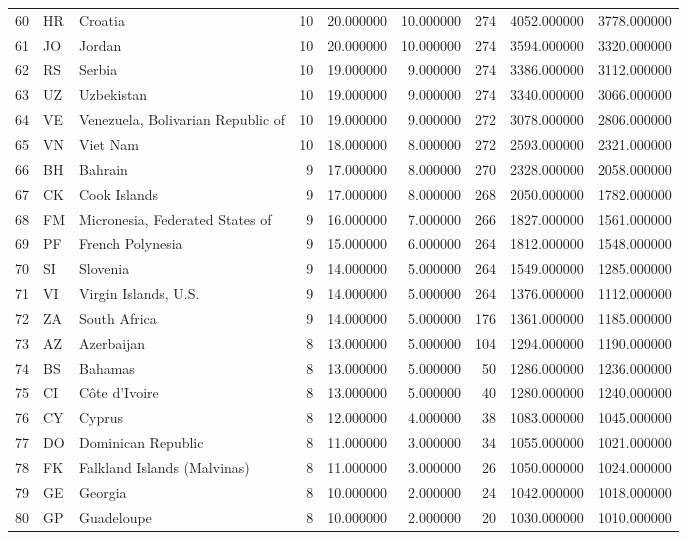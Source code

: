 \begin{tabular}{lllrrrrrr}
60 & HR & Croatia & 10 & 20.000000 & 10.000000 & 274 & 4052.000000 & 3778.000000 \\
61 & JO & Jordan & 10 & 20.000000 & 10.000000 & 274 & 3594.000000 & 3320.000000 \\
62 & RS & Serbia & 10 & 19.000000 & 9.000000 & 274 & 3386.000000 & 3112.000000 \\
63 & UZ & Uzbekistan & 10 & 19.000000 & 9.000000 & 274 & 3340.000000 & 3066.000000 \\
64 & VE & Venezuela, Bolivarian Republic of & 10 & 19.000000 & 9.000000 & 272 & 3078.000000 & 2806.000000 \\
65 & VN & Viet Nam & 10 & 18.000000 & 8.000000 & 272 & 2593.000000 & 2321.000000 \\
66 & BH & Bahrain & 9 & 17.000000 & 8.000000 & 270 & 2328.000000 & 2058.000000 \\
67 & CK & Cook Islands & 9 & 17.000000 & 8.000000 & 268 & 2050.000000 & 1782.000000 \\
68 & FM & Micronesia, Federated States of & 9 & 16.000000 & 7.000000 & 266 & 1827.000000 & 1561.000000 \\
69 & PF & French Polynesia & 9 & 15.000000 & 6.000000 & 264 & 1812.000000 & 1548.000000 \\
70 & SI & Slovenia & 9 & 14.000000 & 5.000000 & 264 & 1549.000000 & 1285.000000 \\
71 & VI & Virgin Islands, U.S. & 9 & 14.000000 & 5.000000 & 264 & 1376.000000 & 1112.000000 \\
72 & ZA & South Africa & 9 & 14.000000 & 5.000000 & 176 & 1361.000000 & 1185.000000 \\
73 & AZ & Azerbaijan & 8 & 13.000000 & 5.000000 & 104 & 1294.000000 & 1190.000000 \\
74 & BS & Bahamas & 8 & 13.000000 & 5.000000 & 50 & 1286.000000 & 1236.000000 \\
75 & CI & Côte d'Ivoire & 8 & 13.000000 & 5.000000 & 40 & 1280.000000 & 1240.000000 \\
76 & CY & Cyprus & 8 & 12.000000 & 4.000000 & 38 & 1083.000000 & 1045.000000 \\
77 & DO & Dominican Republic & 8 & 11.000000 & 3.000000 & 34 & 1055.000000 & 1021.000000 \\
78 & FK & Falkland Islands (Malvinas) & 8 & 11.000000 & 3.000000 & 26 & 1050.000000 & 1024.000000 \\
79 & GE & Georgia & 8 & 10.000000 & 2.000000 & 24 & 1042.000000 & 1018.000000 \\
80 & GP & Guadeloupe & 8 & 10.000000 & 2.000000 & 20 & 1030.000000 & 1010.000000 \\

\end{tabular}
